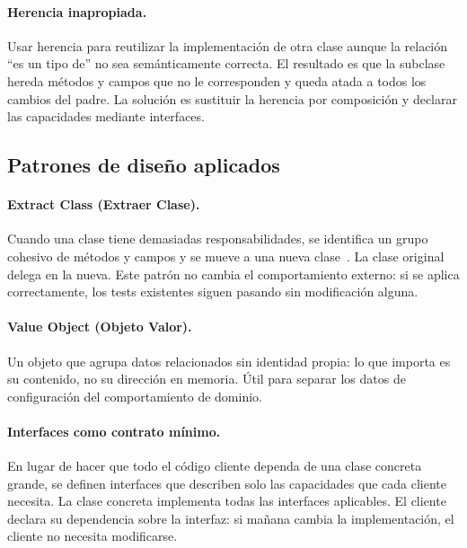 \documentclass[11pt,a4paper]{article}
\begin{document}
\paragraph{Herencia inapropiada.}
Usar herencia para reutilizar la implementación de otra clase aunque la
relación ``es un tipo de'' no sea semánticamente correcta.  El resultado
es que la subclase hereda métodos y campos que no le corresponden y queda
atada a todos los cambios del padre.  La solución es sustituir la herencia
por composición y declarar las capacidades mediante interfaces.

\subsection{Patrones de diseño aplicados}
\label{sec:patrones}

\paragraph{Extract Class (Extraer Clase).}
Cuando una clase tiene demasiadas responsabilidades, se identifica un grupo
cohesivo de métodos y campos y se mueve a una nueva clase~\cite{fowler2019}.
La clase original delega en la nueva.  Este patrón no cambia el
comportamiento externo: si se aplica correctamente, los tests existentes
siguen pasando sin modificación alguna.

\paragraph{Value Object (Objeto Valor).}
Un objeto que agrupa datos relacionados sin identidad propia: lo que
importa es su contenido, no su dirección en memoria.  Útil para separar
los datos de configuración del comportamiento de dominio.

\paragraph{Interfaces como contrato mínimo.}
En lugar de hacer que todo el código cliente dependa de una clase concreta
grande, se definen interfaces que describen solo las capacidades que cada
cliente necesita.  La clase concreta implementa todas las interfaces
aplicables.  El cliente declara su dependencia sobre la interfaz: si
mañana cambia la implementación, el cliente no necesita modificarse.

\end{document}

